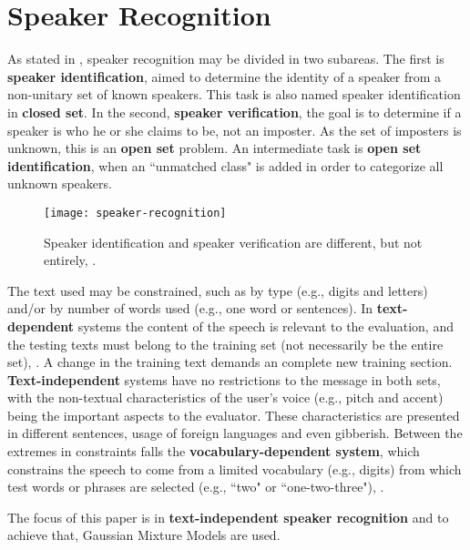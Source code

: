 \section{Speaker Recognition}
\label{sec:speaker-recognition}

As stated in , speaker recognition may be divided in two subareas. The first is \textbf{speaker identification}, aimed to determine the identity of a speaker from a non-unitary set of known speakers. This task is also named speaker identification in \textbf{closed set}. In the second, \textbf{speaker verification}, the goal is to determine if a speaker is who he or she claims to be, not an imposter. As the set of imposters is unknown, this is an \textbf{open set} problem. An intermediate task is \textbf{open set identification}, when an ``unmatched class" is added in order to categorize all unknown speakers.

\begin{figure}[ht]
    \centering
    \texttt{[image: speaker-recognition]}
    \caption{Speaker identification and speaker verification are different, but not entirely, .}
    \label{fig:speaker-recognition}
\end{figure}

The text used may be constrained, such as by type (e.g., digits and letters) and/or by number of words used (e.g., one word or sentences). In \textbf{text-dependent} systems the content of the speech is relevant to the evaluation, and the testing texts must belong to the training set (not necessarily be the entire set), . A change in the training text demands an complete new training section. \textbf{Text-independent} systems have no restrictions to the message in both sets, with the non-textual characteristics of the user's voice (e.g., pitch and accent) being the important aspects to the evaluator. These characteristics are presented in different sentences, usage of foreign languages and even gibberish. Between the extremes in constraints falls the \textbf{vocabulary-dependent system}, which constrains the speech to come from a limited vocabulary (e.g., digits) from which test words or phrases are selected (e.g., ``two" or ``one-two-three"), .

The focus of this paper is in \textbf{text-independent speaker recognition} and to achieve that, Gaussian Mixture Models are used.

